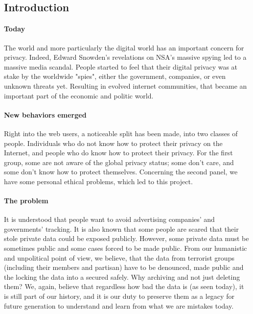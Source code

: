 
\subsection{Introduction}
\paragraph{Today} The world and more particularly the digital world has an important concern for privacy. Indeed, Edward Snowden's revelations on NSA's massive spying\cite{EdwardSnowdenArchive} led to a massive media scandal. People started to feel that their digital privacy was at stake by the worldwide "spies", either the government, companies, or even unknown threats yet. Resulting in evolved internet communities, that became an important part of the economic and politic world.

\paragraph{New behaviors emerged} Right into the web users, a noticeable split has been made, into two classes of people. Individuals who do not know how to protect their privacy on the Internet, and people who do know how to protect their privacy. For the first group, some are not aware of the global privacy status; some don't care, and some don't know how to protect themselves. Concerning the second panel, we have some personal ethical problems, which led to this project.

\paragraph{The problem} It is understood that people want to avoid advertising companies' and governments' tracking. It is also known that some people are scared that their stole private data could be exposed publicly. However, some private data must be sometimes public and some cases forced to be made public. From our humanistic and unpolitical point of view, we believe, that the data from terrorist groups (including their members and partisan) have to be denounced, made public and the locking the data into a secured safely. Why archiving and not just deleting them? We, again, believe that regardless how bad the data is (as seen today), it is still part of our history, and it is our duty to preserve them as a legacy for future generation to understand and learn from what we are mistakes today.

